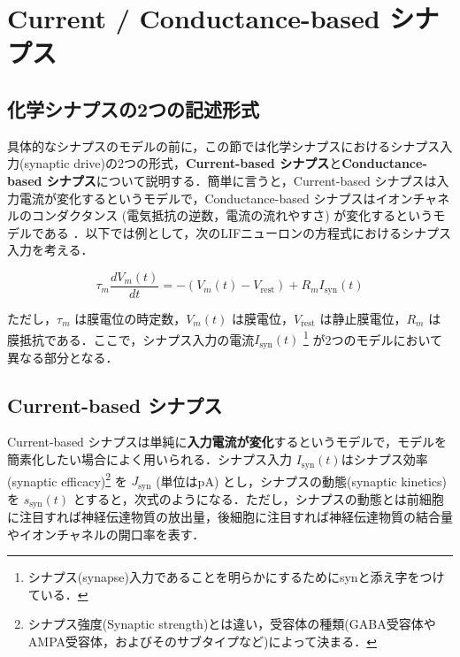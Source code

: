 \section{Current / Conductance-based シナプス
}


\subsection{化学シナプスの2つの記述形式
}


具体的なシナプスのモデルの前に，この節では化学シナプスにおけるシナプス入力(synaptic drive)の2つの形式，\textbf{Current-based シナプス}と\textbf{Conductance-based シナプス}について説明する．簡単に言うと，Current-based シナプスは入力電流が変化するというモデルで，Conductance-based シナプスはイオンチャネルのコンダクタンス (電気抵抗の逆数，電流の流れやすさ) が変化するというモデルである \citep{Cavallari2014-jx}．以下では例として，次のLIFニューロンの方程式におけるシナプス入力を考える．





\begin{equation}

\tau_m \frac{dV_{m}(t)}{dt}=-(V_{m}(t)-V_\text{rest})+R_m I_{\text{syn}}(t)    

\end{equation}





ただし，$\tau_m$ は膜電位の時定数，$V_m(t)$ は膜電位，$V_\text{rest}$ は静止膜電位，$R_m$ は膜抵抗である．ここで，シナプス入力の電流$I_{\text{syn}}(t)$ \footnote{シナプス(synapse)入力であることを明らかにするためにsynと添え字をつけている．} が2つのモデルにおいて異なる部分となる．



\subsection{Current-based シナプス
}
Current-based シナプスは単純に\textbf{入力電流が変化}するというモデルで，モデルを簡素化したい場合によく用いられる．シナプス入力 $I_{\text{syn}}(t)$はシナプス効率(synaptic efficacy)\footnote{シナプス強度(Synaptic strength)とは違い，受容体の種類(GABA受容体やAMPA受容体，およびそのサブタイプなど)によって決まる．} を $J_{\text{syn}}$ (単位はpA) とし，シナプスの動態(synaptic kinetics)を $s_{\text{syn}}(t)$ とすると，次式のようになる．ただし，シナプスの動態とは前細胞に注目すれば神経伝達物質の放出量，後細胞に注目すれば神経伝達物質の結合量やイオンチャネルの開口率を表す．





